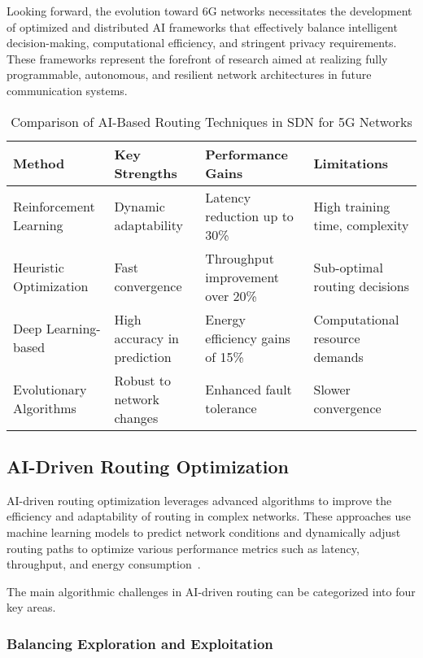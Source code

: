 \documentclass[sigconf]{acmart}
\begin{document}
Looking forward, the evolution toward 6G networks necessitates the development of optimized and distributed AI frameworks that effectively balance intelligent decision-making, computational efficiency, and stringent privacy requirements. These frameworks represent the forefront of research aimed at realizing fully programmable, autonomous, and resilient network architectures in future communication systems.

\begin{table*}[htbp]
\centering
\caption{Comparison of AI-Based Routing Techniques in SDN for 5G Networks}
\label{tab:ai-routing-comparison}
\begin{adjustbox}{max width=\textwidth}
\begin{tabular}{@{}llll@{}}
\toprule
\textbf{Method} & \textbf{Key Strengths} & \textbf{Performance Gains} & \textbf{Limitations} \\
\midrule
Reinforcement Learning & Dynamic adaptability & Latency reduction up to 30\% & High training time, complexity \\
Heuristic Optimization & Fast convergence & Throughput improvement over 20\% & Sub-optimal routing decisions \\
Deep Learning-based & High accuracy in prediction & Energy efficiency gains of 15\% & Computational resource demands \\
Evolutionary Algorithms & Robust to network changes & Enhanced fault tolerance & Slower convergence \\
\bottomrule
\end{tabular}
\end{adjustbox}
\end{table*}

\subsection{AI-Driven Routing Optimization}

AI-driven routing optimization leverages advanced algorithms to improve the efficiency and adaptability of routing in complex networks. These approaches use machine learning models to predict network conditions and dynamically adjust routing paths to optimize various performance metrics such as latency, throughput, and energy consumption~\cite{}.

The main algorithmic challenges in AI-driven routing can be categorized into four key areas.

\subsubsection{Balancing Exploration and Exploitation}
\end{document}
